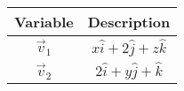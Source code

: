 \begin{tabular}[12pt]{ |c| c|}
    \hline
    \textbf{Variable} & \textbf{Description}\\ 
    \hline
    $\vec{v}_1$ & $x\hat{i}+2\hat{j}+z\hat{k}$\\
    \hline
    $\vec{v}_2$ & $2\hat{i}+y\hat{j}+\hat{k}$\\ 
    \end{tabular}
